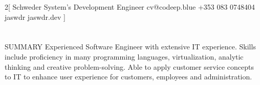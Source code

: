 \documentclass{my_cv}
\begin{document}
\begin{multicols}{2}[
        {Schweder}%
        {System's Development Engineer}%
        {cv@codeep.blue}%
        {+353 083 0748404}%
        {jaswdr}%
        {jaswdr.dev}%
]
\end{multicols}

\section{\faFileText}{SUMMARY}
Experienced Software Engineer with extensive IT experience. Skills include proficiency in many programming languages, virtualization, analytic thinking and creative problem-solving. Able to apply customer service concepts to IT to enhance user experience for customers, employees and administration.
\end{document}
